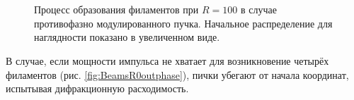 \begin{figure}[H]
\begin{center}
\begin{minipage}{\minipagewidththree}
        \end{minipage}
        \hfill
        \begin{minipage}{\minipagewidththree}
        \end{minipage}
        \hfill
        \begin{minipage}{\minipagewidththree}
        \end{minipage}
       \\[0.5ex]
        \begin{minipage}{\minipagewidththree}
        \end{minipage}
        \hfill
        \begin{minipage}{\minipagewidththree}
        \end{minipage}
        \hfill
        \begin{minipage}{\minipagewidththree}
        \end{minipage}
       \\[0.5ex]
        \caption{Процесс образования филаментов при $R = 100$ в случае противофазно модулированного пучка.
                 Начальное распределение для наглядности показано в увеличенном виде.}
        \label{fig:BeamsR100outphase}
    \end{center}
\end{figure}


В случае, если мощности импульса не хватает для возникновение четырёх филаментов
(рис. \ref{fig:BeamsR0outphase}), пички убегают от начала координат,
испытывая дифракционную расходимость.

